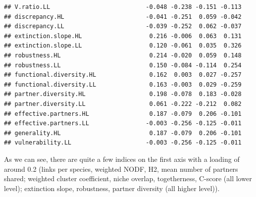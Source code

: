 \documentclass[a4paper, 11pt]{article}\usepackage[]{graphicx}\usepackage[]{color}
\makeatletter
\newenvironment{kframe}{%
 \def\at@end@of@kframe{}%
 \ifinner\ifhmode%
  \def\at@end@of@kframe{\end{minipage}}%
  \begin{minipage}{\columnwidth}%
 \fi\fi%
 \def\FrameCommand##1{\hskip\@totalleftmargin \hskip-\fboxsep
 \colorbox{shadecolor}{##1}\hskip-\fboxsep
     \hskip-\linewidth \hskip-\@totalleftmargin \hskip\columnwidth}%
 \MakeFramed {\advance\hsize-\width
   \@totalleftmargin\z@ \linewidth\hsize
   \@setminipage}}%
 {\par\unskip\endMakeFramed%
 \at@end@of@kframe}
\newenvironment{knitrout}{}{} %
\makeatother
\begin{document}
\begin{knitrout}
\begin{kframe}
\begin{verbatim}
## V.ratio.LL                           -0.048 -0.238 -0.151 -0.113
## discrepancy.HL                       -0.041 -0.251  0.059 -0.042
## discrepancy.LL                       -0.039 -0.252  0.062 -0.037
## extinction.slope.HL                   0.216 -0.006  0.063  0.131
## extinction.slope.LL                   0.120 -0.061  0.035  0.326
## robustness.HL                         0.214 -0.020  0.059  0.148
## robustness.LL                         0.150 -0.084 -0.114  0.254
## functional.diversity.HL               0.162  0.003  0.027 -0.257
## functional.diversity.LL               0.163 -0.003  0.029 -0.259
## partner.diversity.HL                  0.198 -0.078  0.183 -0.028
## partner.diversity.LL                  0.061 -0.222 -0.212  0.082
## effective.partners.HL                 0.187 -0.079  0.206 -0.101
## effective.partners.LL                -0.003 -0.256 -0.125 -0.011
## generality.HL                         0.187 -0.079  0.206 -0.101
## vulnerability.LL                     -0.003 -0.256 -0.125 -0.011
\end{verbatim}
\end{kframe}
\end{knitrout}
As we can see, there are quite a few indices on the first axis with a loading of around 0.2 (links per species, weighted NODF, H2, mean number of partners shared; weighted cluster coefficient, niche overlap, togetherness, C-score (all lower level); extinction slope, robustness, partner diversity (all higher level)). 
\end{document}
